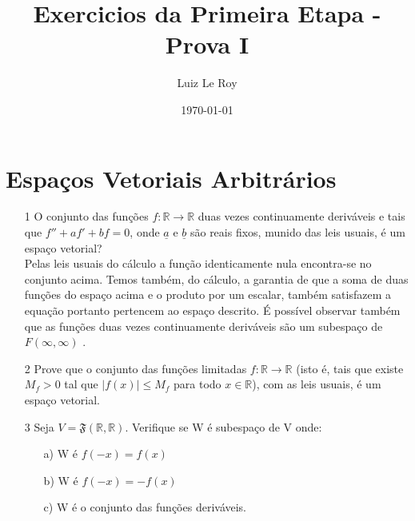 \documentclass[a4paper]{article}
\title{Exercicios da Primeira Etapa - Prova I}
\date{\mydate\today}
\author{Luiz Le Roy}
\begin{document}
  \maketitle

\section*{Espaços Vetoriais Arbitrários}
\begin{itemize}
\item[1] O conjunto das funções $f:\mathbb{R}\longrightarrow \mathbb{R}$ duas vezes continuamente deriváveis e tais que $f''+af'+bf=0$, onde $\underline{a}$ e $\underline{b}$ são reais fixos, munido das leis usuais, é um espaço vetorial?
\\\textcolor[rgb]{0,0,1}{Pelas leis usuais do cálculo a função identicamente nula encontra-se no conjunto acima. Temos também, do cálculo, a garantia de que a soma de duas funções do espaço acima e o produto por um escalar, também satisfazem a equação portanto pertencem ao espaço descrito. É possível observar também que as funções duas vezes continuamente deriváveis são um subespaço de $F(\infty,\infty)$ .%
}
\item[2] Prove que o conjunto das funções limitadas $f:\mathbb{R}\longrightarrow \mathbb{R}$ (isto é, tais que existe $M_f>0$ tal que $|f(x)|\leq M_f$ para todo $x\in \mathbb{R}$), com as leis usuais, é um espaço vetorial.

\item[3] Seja $V=\mathfrak{F}(\mathbb{R,R})$. Verifique se W é subespaço de V onde:
\begin{itemize}
\item [a)] W é $f(-x)=f(x)$
\item [b)] W é $f(-x)=-f(x)$
\item[c)] W é o conjunto das funções deriváveis.
\end{itemize}


\end{itemize}
\end{document}
